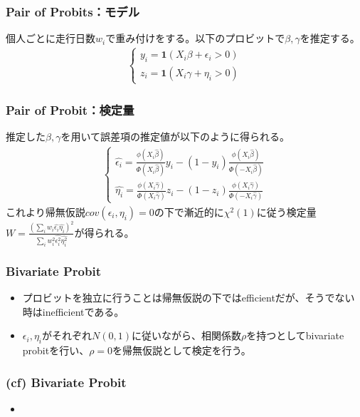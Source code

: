 \documentclass[dvipdfmx, 12pt]{beamer}
\begin{document}
\begin{frame}\frametitle{Pair of Probits：モデル}
個人ごとに走行日数$w_i$で重み付けをする。以下のプロビットで$\beta, \gamma$を推定する。
	\begin{align*}
	\begin{cases}
	y_i = {\bm 1}(X_i \beta + \epsilon_i > 0)\\[8pt]
	z_i = {\bm 1}(X_i \gamma + \eta_i > 0)
	\end{cases}
	\end{align*}
\end{frame}

\begin{frame}\frametitle{Pair of Probit：検定量}
推定した$\beta, \gamma$を用いて誤差項の推定値が以下のように得られる。
\begin{align*}
\begin{cases}
	\hat{\epsilon_i} = \frac{\phi(X_i \hat{\beta})}{\Phi(X_i \hat{\beta})} y_i - (1 - y_i) \frac{\phi(X_i \hat{\beta})}{\Phi(-X_i \hat{\beta})}\\[8pt]
	\hat{\eta_i} = \frac{\phi(X_i \hat{\gamma})}{\Phi(X_i \hat{\gamma})} z_i - (1 - z_i) \frac{\phi(X_i \hat{\gamma})}{\Phi(-X_i \hat{\gamma})}
\end{cases}
\end{align*}
これより帰無仮説$cov(\epsilon_i, \eta_i) = 0$の下で漸近的に$\chi^2(1)$に従う検定量$W = \frac{\left( \sum_{i} w_i \hat{\epsilon_i} \hat{\eta_i} \right)^2}{\sum_{i} w_i^2\hat{\epsilon_i^2}\hat{\eta_i^2}}$が得られる。
\end{frame}

\begin{frame}\frametitle{Bivariate Probit}
	\begin{itemize}
	\item プロビットを独立に行うことは帰無仮説の下ではefficientだが、そうでない時はinefficientである。
	\item $\epsilon_i, \eta_i$がそれぞれ$N(0,1)$に従いながら、相関係数$\rho$を持つとしてbivariate probitを行い、$\rho = 0$を帰無仮説として検定を行う。
	\end{itemize}
\end{frame}

\begin{frame}\frametitle{(cf) Bivariate Probit}
	\begin{itemize}
	\item 
	\end{itemize}
\end{frame}
\end{document}
